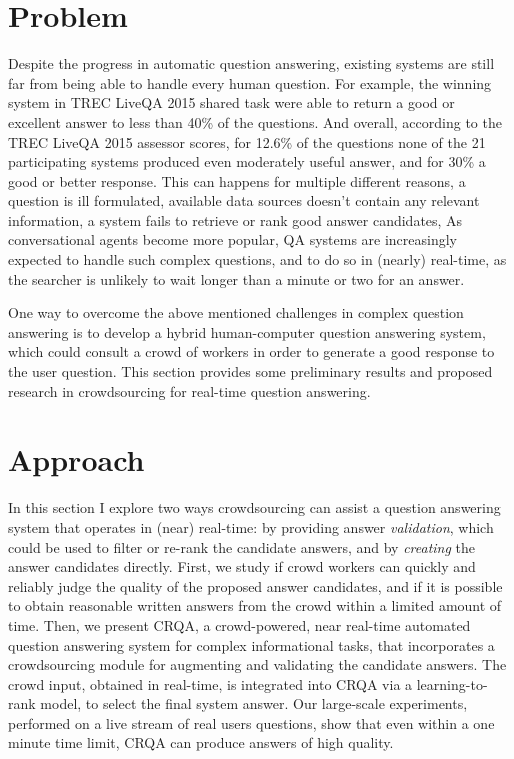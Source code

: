 %

\label{chapter:crowdsourcing}

\noindent

\section{Problem}
\label{section:crowdsourcing:problem}

Despite the progress in automatic question answering, existing systems are still far from being able to handle every human question.
For example, the winning system in TREC LiveQA 2015 shared task were able to return a good or excellent answer to less than 40\% of the questions.
And overall, according to the TREC LiveQA 2015 assessor scores, for 12.6\% of the questions none of the 21 participating systems produced even moderately useful answer, and for 30\% a good or better response.
This can happens for multiple different reasons, \eg a question is ill formulated, available data sources doesn't contain any relevant information, a system fails to retrieve or rank good answer candidates, \etc
As conversational agents become more popular, QA systems are increasingly expected to handle such complex questions, and to do so in (nearly) real-time, as the searcher is unlikely to wait longer than a minute or two for an answer.

One way to overcome the above mentioned challenges in complex question answering is to develop a hybrid human-computer question answering system, which could consult a crowd of workers in order to generate a good response to the user question.
This section provides some preliminary results and proposed research in crowdsourcing for real-time question answering.

\section{Approach}
\label{section:crowdsourcing:approach}

In this section I explore two ways crowdsourcing can assist a question answering system that operates in (near) real-time: by providing answer {\em validation}, which could be used to filter or re-rank the candidate answers, and by {\em creating} the answer candidates directly.
First, we study if crowd workers can quickly and reliably judge the quality of the proposed answer candidates, and if it is possible to obtain reasonable written answers from the crowd within a limited amount of time.
Then, we present CRQA, a crowd-powered, near real-time automated question answering system for complex informational tasks, that incorporates a crowdsourcing module for augmenting and validating the candidate answers.
The crowd input, obtained in real-time, is integrated into CRQA via a learning-to-rank model, to select the final system answer.
Our large-scale experiments, performed on a live stream of real users questions, show that even within a one minute time limit, CRQA can produce answers of high quality.

